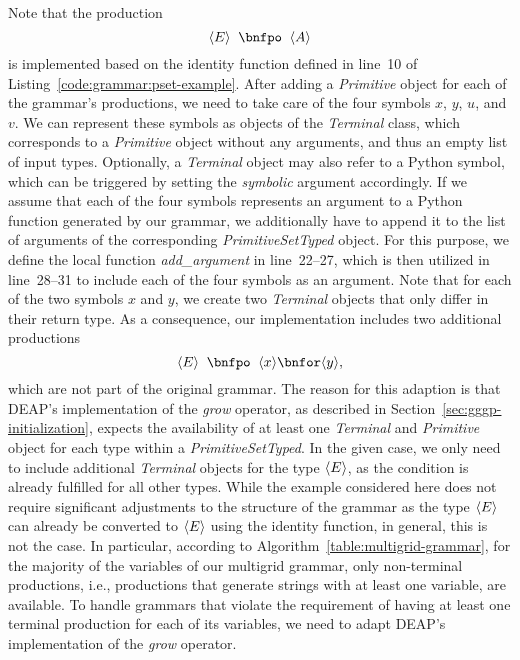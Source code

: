 Note that the production
\begin{equation*}
	\ps E \; \; \bnfpo \; \; \ps A
\end{equation*}
is implemented based on the identity function defined in line~10 of Listing~\ref{code:grammar:pset-example}.
After adding a \emph{Primitive} object for each of the grammar's productions, we need to take care of the four symbols $x$, $y$, $u$, and $v$.
We can represent these symbols as objects of the \emph{Terminal} class, which corresponds to a \emph{Primitive} object without any arguments, and thus an empty list of input types.
Optionally, a \emph{Terminal} object may also refer to a Python symbol, which can be triggered by setting the \emph{symbolic} argument accordingly.
If we assume that each of the four symbols represents an argument to a Python function generated by our grammar, we additionally have to append it to the list of arguments of the corresponding \emph{PrimitiveSetTyped} object.
For this purpose, we define the local function \emph{add\_argument} in line~22--27, which is then utilized in line~28--31 to include each of the four symbols as an argument. 
Note that for each of the two symbols $x$ and $y$, we create two \emph{Terminal} objects that only differ in their return type.
As a consequence, our implementation includes two additional productions
\begin{equation*}
	\ps E \; \; \bnfpo \; \; \ps x \bnfor \ps y,
\end{equation*}
which are not part of the original grammar.
The reason for this adaption is that DEAP's implementation of the \emph{grow} operator, as described in Section~\ref{sec:gggp-initialization}, expects the availability of at least one \emph{Terminal} and \emph{Primitive} object for each type within a \emph{PrimitiveSetTyped}.
In the given case, we only need to include additional \emph{Terminal} objects for the type $\langle E \rangle$, as the condition is already fulfilled for all other types.
While the example considered here does not require significant adjustments to the structure of the grammar as the type $\langle E \rangle$ can already be converted to $\langle E \rangle$ using the identity function, in general, this is not the case.
In particular, according to Algorithm~\ref{table:multigrid-grammar}, for the majority of the variables of our multigrid grammar, only non-terminal productions, i.e., productions that generate strings with at least one variable, are available.
To handle grammars that violate the requirement of having at least one terminal production for each of its variables, we need to adapt DEAP's implementation of the \emph{grow} operator.
